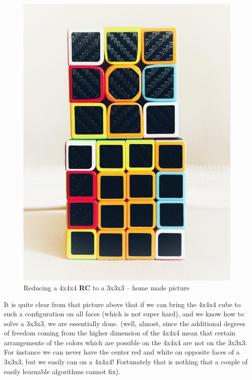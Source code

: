\begin{figure}[H]
\centering
\includegraphics[scale=0.3]{./Figures/RC333444}
\caption[Reducing RC]{Reducing a 4x4x4 \textbf{RC} to a 3x3x3 -- home made picture}
\end{figure}


\noindent It is quite clear from that picture above that if we can bring the 4x4x4 cube to such a configuration on all faces (which is not super hard), and we know how to solve a 3x3x3, we are essentially done. (well, almost, since the additional degrees of freedom coming from the higher dimension of the 4x4x4 mean that certain arrangements of the colors which are possible on the 4x4x4 are not on the 3x3x3. For instance we can never have the center red and white on opposite faces of a 3x3x3, but we easily can on a 4x4x4! Fortunately that is nothing that a couple of easily learnable algorithms cannot fix).




